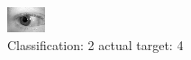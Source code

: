 \begin{figure}[h!]
\begin{center}
\includegraphics[width=0.60\columnwidth]{figures/ID831_class_2_target_4.png}
\end{center}
\caption{ Classification: 2 actual target: 4}
\label{fig:ID831_class_2_target_4}
\end{figure}
